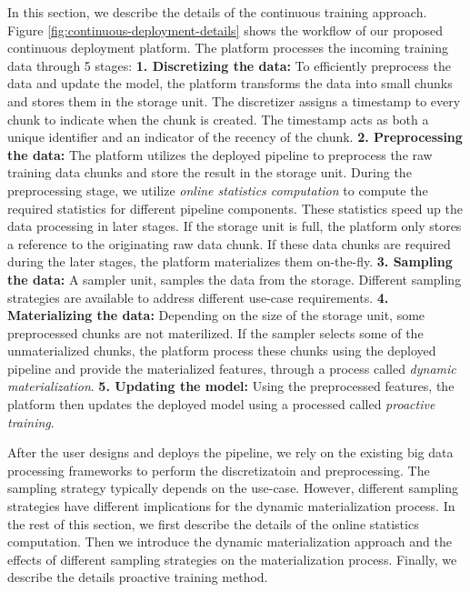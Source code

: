In this section, we describe the details of the continuous training approach.
Figure \ref{fig:continuous-deployment-details} shows the workflow of our proposed continuous deployment platform.
The platform processes the incoming training data through 5 stages:\newline
\textbf{1. Discretizing the data: } 
To efficiently preprocess the data and update the model, the platform transforms the data into small chunks and stores them in the storage unit. The discretizer assigns a timestamp to every chunk to indicate when the chunk is created. The timestamp acts as both a unique identifier and an indicator of the recency of the chunk.\newline
\textbf{2. Preprocessing the data: } 
The platform utilizes the deployed pipeline to preprocess the raw training data chunks and store the result in the storage unit.
During the preprocessing stage, we utilize \textit{online statistics computation} to compute the required statistics for different pipeline components.
These statistics speed up the data processing in later stages. \newline
If the storage unit is full, the platform only stores a reference to the originating raw data chunk.
If these data chunks are required during the later stages, the platform materializes them on-the-fly. \newline
\textbf{3. Sampling the data: }
A sampler unit, samples the data from the storage.
Different sampling strategies are available to address different use-case requirements.\newline
\textbf{4. Materializing the data: }
Depending on the size of the storage unit, some preprocessed chunks are not materilized.
If the sampler selects some of the unmaterialized chunks, the platform process these chunks using the deployed pipeline and provide the materialized features, through a process called \textit{dynamic materialization}.\newline
\textbf{5. Updating the model: }
Using the preprocessed features, the platform then updates the deployed model using a processed called \textit{proactive training}.\newline

After the user designs and deploys the pipeline, we rely on the existing big data processing frameworks to perform the discretizatoin and preprocessing.
The sampling strategy typically depends on the use-case.
However, different sampling strategies have different implications for the dynamic materialization process.
In the rest of this section, we first describe the details of the online statistics computation.
Then we introduce the dynamic materialization approach and the effects of different sampling strategies on the materialization process.
Finally, we describe the details proactive training method.

